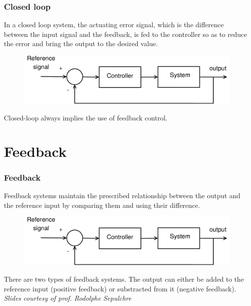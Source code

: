 \documentclass{beamer}
\begin{document}
\begin{frame}
\frametitle{Closed loop}
In a closed loop system, the actuating error signal, which is the difference between the input signal and the feedback, is fed to the controller so as to reduce the error and bring the output to the desired value. 
\medskip
\begin{figure}
\includegraphics[width=1\linewidth]{closed_loop}
\end{figure}
\bigskip
Closed-loop always implies the use of feedback control.
\end{frame}

\section{Feedback} 

\begin{frame}
\frametitle{Feedback}
Feedback systems maintain the prescribed relationship between the output and the reference input by comparing them and using their difference.
\medskip
\begin{figure}
\includegraphics[width=1\linewidth]{closed_loop}
\end{figure}
There are two types of feedback systems. The output can either be added to the reference input (positive feedback) or substracted from it (negative feedback).\\
\medskip
\textit{Slides courtesy of prof. Rodolphe Sepulchre}
\end{frame}

\end{document}
